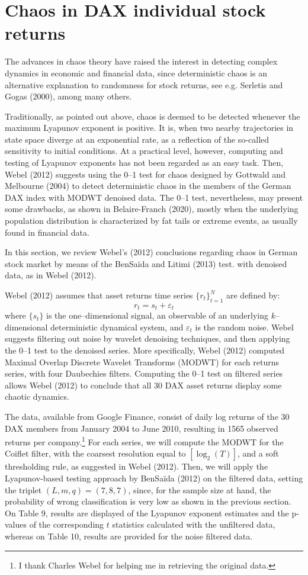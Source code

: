 \documentclass[12pt]{article}
\begin{document}
\section{Chaos in DAX individual stock returns}


The advances in chaos theory have raised the interest in detecting complex dynamics
in economic and financial data, since
deterministic chaos is an alternative explanation to randomness for stock returns, see e.g. 
Serletis and Gogas (2000), among many others.

Traditionally, as pointed out above, chaos is deemed to be detected whenever the maximum Lyapunov exponent is 
positive. It is, when two nearby trajectories in state space diverge at an exponential
rate, as a reflection of the so-called sensitivity to initial conditions.
At a practical level, however, computing and testing of Lyapunov exponents
has not been regarded as an easy task. Then, Webel (2012) suggests using
the 0--1 test for chaos designed by Gottwald and Melbourne (2004) to detect deterministic chaos
in the members of the German DAX index with MODWT denoised data.
The 0--1 test, nevertheless, may present some drawbacks, as shown in Belaire-Franch (2020),
mostly when the underlying population distribution is characterized by fat tails
or extreme events, as usually found in financial data. 

In this section, we review Webel's (2012) conclusions regarding chaos in German stock market by
means  of the BenSa\"{i}da and Litimi (2013) test. with denoised data, as in Webel (2012).


Webel (2012) assumes that asset returns time series $\{r_t\}_{t=1}^N$ are defined by:
\[
r_t=s_t+\varepsilon_t
\]
where $\{s_t\}$ is the one--dimensional signal, an observable of an underlying $k$--dimensional
deterministic dynamical system, and ${\varepsilon_t}$ is the random noise. Webel suggests
filtering out noise by wavelet denoising techniques, and then applying the 0--1 test
to the denoised series.
More specifically, Webel (2012) computed
Maximal Overlap Discrete Wavelet Transforms (MODWT) for each returns series, with
four Daubechies filters. Computing the 0--1 test
on filtered series allows Webel (2012) to conclude that all 30 DAX asset returns display some chaotic dynamics.

The data, available from Google Finance, consist of daily log returns of the 30 DAX members
from January 2004 to June 2010, resulting in 1565 observed returns
per company.\footnote{I thank Charles Webel for helping me in retrieving the original data.}
For each series, we will compute the MODWT for the Coiflet filter, with the coarsest resolution equal to $[\log_2(T)]$, and a soft thresholding rule, as suggested in
Webel (2012).
Then, 
we will apply the Lyapunov-based testing approach by BenSa\"{i}da (2012) on the filtered data, setting the triplet
$(L,m,q)=(7,8,7)$, since, for the sample size at hand, the probability of wrong classification is very low as shown in the previous section.
On Table 9, results are displayed of the Lyapunov exponent estimates and the p-values of the corresponding $t$ statistics
calculated with the unfiltered data, whereas on Table 10, results are provided for the noise filtered data. 
\end{document}
